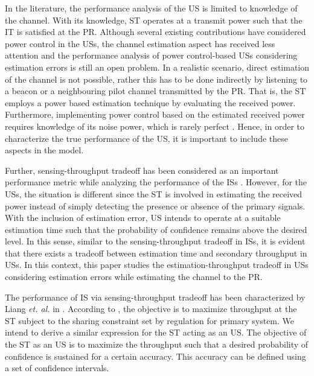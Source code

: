 \documentclass[conference, twocolumn]{IEEEtran}
\begin{document}
In the literature, the performance analysis of the US is limited to knowledge of the channel. With its knowledge, ST operates at a transmit power such that the IT is satisfied at the PR. 
Although several existing contributions have considered power control in the USs, the channel estimation aspect has received less attention and the performance analysis of power control-based USs considering estimation errors is still an open problem. 
In a realistic scenario, 
direct estimation of the channel is not possible, rather this has to be done indirectly by listening to a beacon or a neighbouring pilot channel transmitted by the PR. That is, the ST employs a power based estimation technique by evaluating the received power. Furthermore, implementing power control based on the estimated received power requires knowledge of its noise power, which is rarely perfect \cite{Tan08}. Hence, in order to characterize the true performance of the US, it is important to include these aspects in the model.  

Further, sensing-throughput tradeoff has been considered as an important performance metric while analyzing the performance of the ISs \cite{Liang08, Juarez11, Sharkasi12}. However, for the USs, the situation is different since the ST is involved in estimating the received power instead of simply detecting the presence or absence of the primary signals. With the inclusion of estimation error, US intends to operate at a suitable estimation time such that the probability of confidence remains above the desired level. In this sense, similar to the sensing-throughput tradeoff in ISs, it is evident that there exists a tradeoff between estimation time and secondary throughput in USs. In this context, this paper studies the estimation-throughput tradeoff in USs considering estimation errors while estimating the channel to the PR. 

The performance of IS via sensing-throughput tradeoff has been characterized by Liang \textit{et. al.} in \cite{Liang08}. According to \cite{Liang08}, the objective is to maximize throughput at the ST subject to the sharing constraint set by regulation for primary system. 
We intend to derive a similar expression for the ST acting as an US. %
The objective of the ST as an US is to maximize the throughput such that a desired probability of confidence is sustained for a certain accuracy. This accuracy can be defined using a set of confidence intervals.
\end{document}
